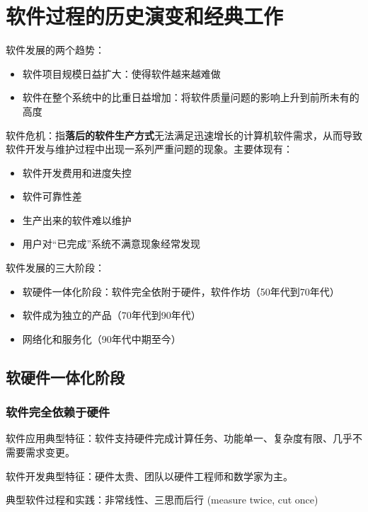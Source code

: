 \section{软件过程的历史演变和经典工作}

软件发展的两个趋势：
\begin{itemize}
    \item 软件项目规模日益扩大：使得软件越来越难做
    \item 软件在整个系统中的比重日益增加：将软件质量问题的影响上升到前所未有的高度
\end{itemize}

软件危机：指\textbf{落后的软件生产方式}无法满足迅速增长的计算机软件需求，从而导致软件开发与维护过程中出现一系列严重问题的现象。主要体现有：
\vspace{-0.8em}
\begin{multicols}{2}
    \begin{itemize}
        \item 软件开发费用和进度失控
        \item 软件可靠性差
        \item 生产出来的软件难以维护
        \item 用户对“已完成”系统不满意现象经常发现
    \end{itemize}
\end{multicols}
\vspace{-1em}

软件发展的三大阶段：
\begin{itemize}
    \item 软硬件一体化阶段：软件完全依附于硬件，软件作坊（50年代到70年代）
    \item 软件成为独立的产品（70年代到90年代）
    \item 网络化和服务化（90年代中期至今）
\end{itemize}


\subsection{软硬件一体化阶段}

\subsubsection{软件完全依赖于硬件}
软件应用典型特征：软件支持硬件完成计算任务、功能单一、复杂度有限、几乎不需要需求变更。

软件开发典型特征：硬件太贵、团队以硬件工程师和数学家为主。

典型软件过程和实践：非常线性、三思而后行 (measure twice, cut once)


